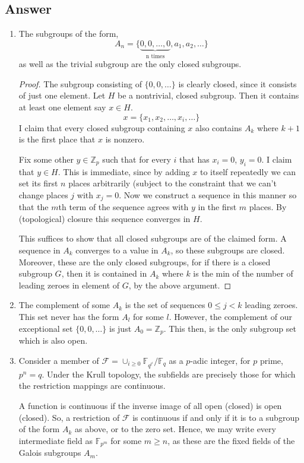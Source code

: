 \documentclass[11pt]{article}
\begin{document}
\subsection{Answer}
\begin{enumerate}
\item The subgroups of the form,
\[A_n=\{\underbrace{0,0, \dots, 0}_{\mbox{n times}},a_1,a_2,\dots\}\]
as well as the trivial subgroup are the only closed subgroups. 

\begin{proof}The subgroup consisting of $\{0,0,\dots\}$ is clearly closed, since it consists of just one element. Let $H$ be a nontrivial, closed subgroup. Then it contains at least one element say $x\in H$. 
\[x = \{x_1, x_2, \dots, x_i, \dots\}\]
I claim that every closed subgroup containing $x$ also contains $A_k$ where $k+1$ is the first place that $x$ is nonzero.

Fix some other $y\in \mathbb{Z}_p$ such that for every $i$ that has $x_i=0$, $y_i=0$. I claim that $y \in H$. This is immediate, since by adding $x$ to itself repeatedly we can set its first $n$ places arbitrarily (subject to the constraint that we can't change places $j$ with $x_j=0$. Now we construct a sequence in this manner so that the $m$th term of the sequence agrees with $y$ in the first $m$ places. By (topological) closure this sequence converges in $H$.

This suffices to show that all closed subgroups are of the claimed form. A sequence in $A_k$ converges to a value in $A_k$, so these subgroups are closed. Moreover, these are the only closed subgroups, for if there is a closed subgroup $G$, then it is contained in $A_k$ where $k$ is the min of the number of leading zeroes in element of $G$, by the above argument.
\end{proof}
\item The complement of some $A_k$ is the set of sequences $0\leq j <k$ leading zeroes. This set never has the form $A_l$ for some $l$. However, the complement of our exceptional set $\{0,0,\dots\}$ is just $A_0=\mathbb{Z}_p$. This then, is the only subgroup set which is also open.
\item Consider a member of $\mathcal{F} = \cup_{i \geq 0}\mathbb{F}_{q^{l^i}}/\mathbb{F}_q$ as a $p$-adic integer, for $p$ prime, $p^n=q$. Under the Krull topology, the subfields are precisely those for which the restriction mappings are continuous. 

A function is continuous if the inverse image of all open (closed) is open (closed). So, a restriction of $\mathcal{F}$ is continuous if and only if it is to a subgroup of the form $A_k$ as above, or to the zero set. Hence, we may write every intermediate field as $\mathbb{F}_{p^m}$ for some $m \geq n$, as these are the fixed fields of the Galois subgroups $A_m$.\end{enumerate}
\end{document}
